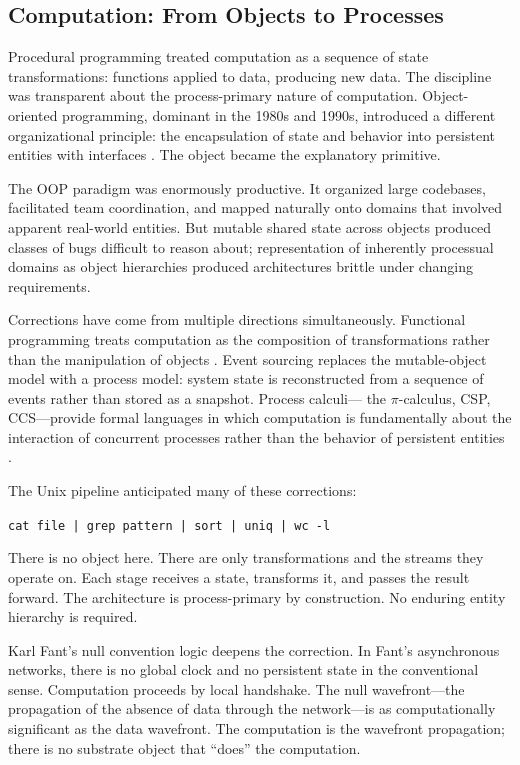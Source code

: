 \documentclass[12pt, a4paper]{article}
\theoremstyle{plain}
\theoremstyle{definition}
\theoremstyle{remark}
\begin{document}
\subsection{Computation: From Objects to Processes}

Procedural programming treated computation as a sequence of state
transformations: functions applied to data, producing new data. The discipline
was transparent about the process-primary nature of computation.
Object-oriented programming, dominant in the 1980s and 1990s, introduced
a different organizational principle: the encapsulation of state and behavior
into persistent entities with interfaces \citep{stroustrup1986}. The object
became the explanatory primitive.

The OOP paradigm was enormously productive. It organized large codebases,
facilitated team coordination, and mapped naturally onto domains that involved
apparent real-world entities. But mutable shared state across objects produced
classes of bugs difficult to reason about; representation of inherently
processual domains as object hierarchies produced architectures brittle under
changing requirements.

Corrections have come from multiple directions simultaneously. Functional
programming treats computation as the composition of transformations rather
than the manipulation of objects \citep{hughes1989}. Event sourcing replaces
the mutable-object model with a process model: system state is reconstructed
from a sequence of events rather than stored as a snapshot. Process calculi---
the $\pi$-calculus, CSP, CCS---provide formal languages in which computation
is fundamentally about the interaction of concurrent processes rather than
the behavior of persistent entities \citep{milner1989,hoare1985}.

The Unix pipeline anticipated many of these corrections:

\begin{center}
\texttt{cat file | grep pattern | sort | uniq | wc -l}
\end{center}

There is no object here. There are only transformations and the streams they
operate on. Each stage receives a state, transforms it, and passes the result
forward. The architecture is process-primary by construction. No enduring
entity hierarchy is required.

Karl Fant's null convention logic \citep{fant1996} deepens the correction.
In Fant's asynchronous networks, there is no global clock and no persistent
state in the conventional sense. Computation proceeds by local handshake.
The null wavefront---the propagation of the absence of data through the
network---is as computationally significant as the data wavefront. The
computation is the wavefront propagation; there is no substrate object
that ``does'' the computation.
\end{document}
